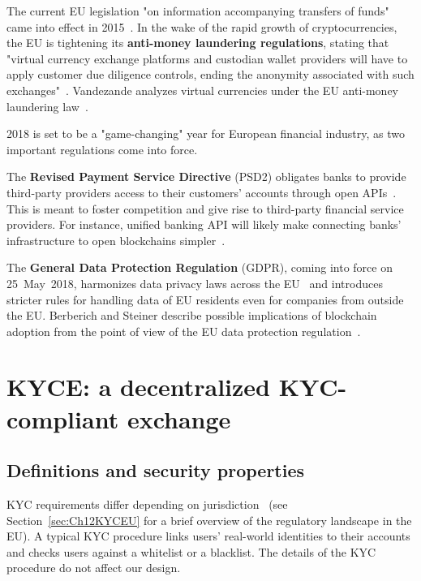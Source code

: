 The current EU legislation "on information accompanying transfers of funds" came into effect in 2015~\cite{EU847}.
In the wake of the rapid growth of cryptocurrencies, the EU is tightening its \textbf{anti-money laundering regulations}, stating that "virtual currency exchange platforms and custodian wallet providers will have to apply customer due diligence controls, ending the anonymity associated with such exchanges"~\cite{EU16}.
Vandezande analyzes virtual currencies under the EU anti-money laundering law~\cite{Vandezande2017}.

2018 is set to be a "game-changing" year for European financial industry, as two important regulations come into force.

The \textbf{Revised Payment Service Directive} (PSD2) obligates banks to provide third-party providers access to their customers' accounts through open APIs~\cite{Hellstroem2017}.
This is meant to foster competition and give rise to third-party financial service providers.
For instance, unified banking API will likely make connecting banks' infrastructure to open blockchains simpler~\cite{Elison2016}.

The \textbf{General Data Protection Regulation} (GDPR), coming into force on 25~May~2018, harmonizes data privacy laws across the EU~\cite{GDPR16} and introduces stricter rules for handling data of EU residents even for companies from outside the EU.
Berberich and Steiner describe possible implications of blockchain adoption from the point of view of the EU data protection regulation~\cite{Berberich2016}.



\section{KYCE: a decentralized KYC-compliant exchange}

\subsection{Definitions and security properties}

KYC requirements differ depending on jurisdiction~\cite{PWC2015} (see Section~\ref{sec:Ch12KYCEU} for a brief overview of the regulatory landscape in the EU).
A typical KYC procedure links users' real-world identities to their accounts and checks users against a whitelist or a blacklist.
The details of the KYC procedure do not affect our design.

